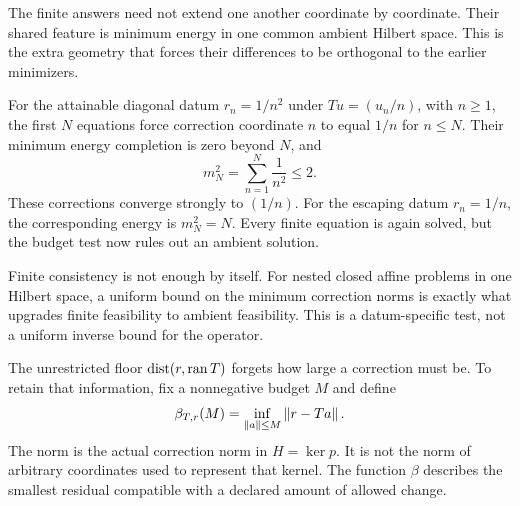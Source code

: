 The finite answers need not extend one another coordinate by coordinate. Their shared feature is minimum energy in one common ambient Hilbert space. This is the extra geometry that forces their differences to be orthogonal to the earlier minimizers.

For the attainable diagonal datum $r_n=1/n^2$ under $Tu=(u_n/n)$, with $n\ge1$, the first $N$ equations force correction coordinate $n$ to equal $1/n$ for $n\le N$. Their minimum energy completion is zero beyond $N$, and
\[
 m_N^2=\sum_{n=1}^{N}\frac1{n^2}\le2.
\]
These corrections converge strongly to $(1/n)$. For the escaping datum $r_n=1/n$, the corresponding energy is $m_N^2=N$. Every finite equation is again solved, but the budget test now rules out an ambient solution.


\begin{insight}
Finite consistency is not enough by itself. For nested closed affine problems in one Hilbert space, a uniform bound on the minimum correction norms is exactly what upgrades finite feasibility to ambient feasibility. This is a datum-specific test, not a uniform inverse bound for the operator.
\end{insight}



\label{KS:sec:budget-frontier}
The unrestricted floor $\operatorname{dist}(r,\operatorname{ran} T)$ forgets how large a correction must be. To retain that information, fix a nonnegative budget $M$ and define
\[
 \beta_{T,r}(M)=\inf_{\left\lVert a\right\rVert\le M}\left\lVert r-Ta\right\rVert.
\]
The norm is the actual correction norm in $H=\ker p$. It is not the norm of arbitrary coordinates used to represent that kernel. The function $\beta$ describes the smallest residual compatible with a declared amount of allowed change.

